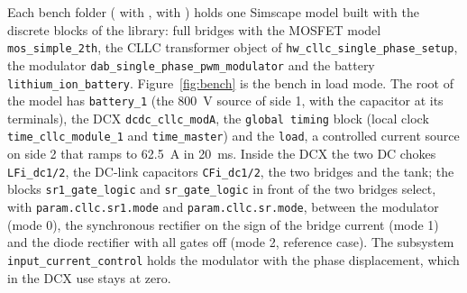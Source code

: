 \documentclass[12pt,a4paper]{scrartcl}
\newcommand{\code}[1]{\texttt{#1}}
\begin{document}
\begin{onehalfspace}
Each bench folder ( with ,  with ) holds one Simscape model built with the discrete blocks of the library: full bridges with the MOSFET model \code{mos\_simple\_2th}, the CLLC transformer object of \code{hw\_cllc\_single\_phase\_setup}, the modulator \code{dab\_single\_phase\_pwm\_modulator} and the battery \code{lithium\_ion\_battery}. Figure~\ref{fig:bench} is the bench in load mode. The root of the model has \code{battery\_1} (the \SI{800}{\volt} source of side 1, with the capacitor at its terminals), the DCX \code{dcdc\_cllc\_modA}, the \code{global timing} block (local clock \code{time\_cllc\_module\_1} and \code{time\_master}) and the \code{load}, a controlled current source on side 2 that ramps to \SI{62.5}{\ampere} in \SI{20}{\milli\second}. Inside the DCX the two DC chokes \code{LFi\_dc1/2}, the DC-link capacitors \code{CFi\_dc1/2}, the two bridges and the tank; the blocks \code{sr1\_gate\_logic} and \code{sr\_gate\_logic} in front of the two bridges select, with \code{param.cllc.sr1.mode} and \code{param.cllc.sr.mode}, between the modulator (mode 0), the synchronous rectifier on the sign of the bridge current (mode 1) and the diode rectifier with all gates off (mode 2, reference case). The subsystem \code{input\_current\_control} holds the modulator with the phase displacement, which in the DCX use stays at zero.


\end{onehalfspace}
\end{document}
